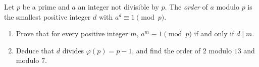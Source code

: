 Let $p$ be a prime and $a$ an integer not divisible by $p$. The \emph{order} of $a$ modulo $p$ is the smallest positive integer $d$ with $a^d\equiv1\pmod p$.
\begin{enumerate}
\item[(a)] Prove that for every positive integer $m$, $a^m\equiv1\pmod p$ if and only if $d\mid m$.
\item[(b)] Deduce that $d$ divides $\varphi(p)=p-1$, and find the order of $2$ modulo $13$ and modulo $7$.
\end{enumerate}
